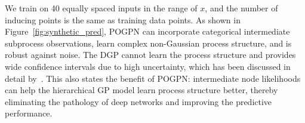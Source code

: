 We train on 40 equally spaced inputs in the range of $x$, and the number of inducing points is the same as training data points. As shown in Figure~\ref{fig:synthetic_pred}, POGPN can incorporate categorical intermediate subprocess observations, learn complex non-Gaussian process structure, and is robust against noise. The DGP cannot learn the process structure and provides wide confidence intervals due to high uncertainty, which has been discussed in detail by~\cite{duvenaud2014avoiding}. This also states the benefit of POGPN: intermediate node likelihoods can help the hierarchical GP model learn process structure better, thereby eliminating the pathology of deep networks and improving the predictive performance.